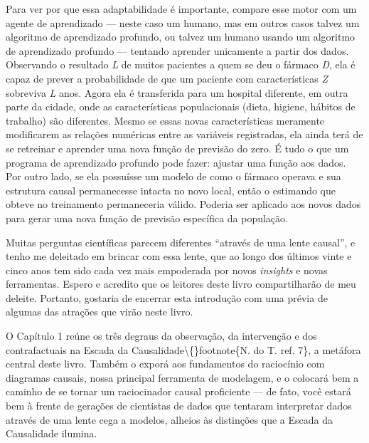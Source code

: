 \documentclass[11pt,a5paper,twoside]{book}
\begin{document}
Para ver por que essa adaptabilidade é importante, compare esse motor com um agente de aprendizado — neste caso um humano, mas em outros casos talvez um algoritmo de aprendizado profundo, ou talvez um humano usando um algoritmo de aprendizado profundo — tentando aprender unicamente a partir dos dados. Observando o resultado \textit{L} de muitos pacientes a quem se deu o fármaco \textit{D}, ela é capaz de prever a probabilidade de que um paciente com características \textit{Z} sobreviva \textit{L} anos. Agora ela é transferida para um hospital diferente, em outra parte da cidade, onde as características populacionais (dieta, higiene, hábitos de trabalho) são diferentes. Mesmo se essas novas características meramente modificarem as relações numéricas entre as variáveis registradas, ela ainda terá de se retreinar e aprender uma nova função de previsão do zero. É tudo o que um programa de aprendizado profundo pode fazer: ajustar uma função aos dados. Por outro lado, se ela possuísse um modelo de como o fármaco operava e sua estrutura causal permanecesse intacta no novo local, então o estimando que obteve no treinamento permaneceria válido. Poderia ser aplicado aos novos dados para gerar uma nova função de previsão específica da população.

Muitas perguntas científicas parecem diferentes “através de uma lente causal”, e tenho me deleitado em brincar com essa lente, que ao longo dos últimos vinte e cinco anos tem sido cada vez mais empoderada por novos \textit{insights} e novas ferramentas. Espero e acredito que os leitores deste livro compartilharão de meu deleite. Portanto, gostaria de encerrar esta introdução com uma prévia de algumas das atrações que virão neste livro.

O Capítulo 1 reúne os três degraus da observação, da intervenção e dos contrafactuais na Escada da Causalidade\textbackslash\{\}footnote\{N. do T. ref. 7\}, a metáfora central deste livro. Também o exporá aos fundamentos do raciocínio com diagramas causais, nossa principal ferramenta de modelagem, e o colocará bem a caminho de se tornar um raciocinador causal proficiente — de fato, você estará bem à frente de gerações de cientistas de dados que tentaram interpretar dados através de uma lente cega a modelos, alheios às distinções que a Escada da Causalidade ilumina.
\end{document}
